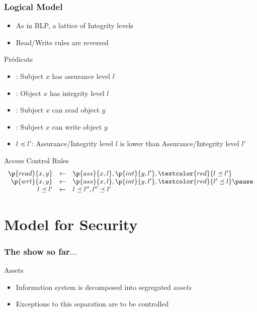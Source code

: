 \begin{reveals}
\begin{frame}
  \frametitle{Logical Model}
  
  \begin{itemize}
  \item As in BLP, a lattice of Integrity levels
  \item Read/Write rules are reversed
  \end{itemize}

  \begin{block}{Pr{\'e}dicats}
    \begin{itemize}
    \item {}: Subject $x$ has assurance level $l$
    \item {}: Object $x$ has integrity level $l$
    \item {}: Subject $x$ can read object $y$
    \item {}: Subject $x$ can write object $y$
    \item $l \preceq l'$: Assurance/Integrity level $l$ is lower than
      Assurance/Integrity level $l'$
    \end{itemize}
  \end{block}

  \pause

  \begin{block}{Access Control Rules}
    $$
    \begin{array}{rcl}
      \p{read}{x,y} & \gets& \p{ass}{x,l}, \p{int}{y,l'}, 
      \textcolor{red}{l \preceq l'}\\
      \p{wrt}{x,y} & \gets &\p{ass}{x,l}, \p{int}{y,l'}, 
      \textcolor{red}{l' \preceq l}\pause\\
      l \preceq l' & \gets & l \preceq l'', l'' \preceq l'\\
    \end{array}
    $$
  \end{block}

\end{frame}


\section{Model for Security}


\begin{frame}
  \frametitle{The show so far\(\ldots\)}

  \begin{block}{Assets}
    \begin{itemize}
    \item Information system is decomposed into segregated \emph{assets}
    \item Exceptions to this separation are to be controlled
    \end{itemize}
  \end{block}


\end{frame}
\end{reveals}
